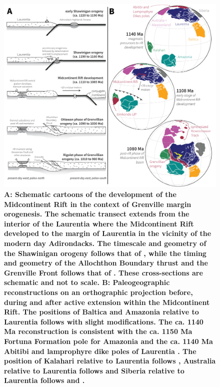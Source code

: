 \documentclass[11pt,letterpaper]{article}
\begin{document}
\begin{figure}
\centering
\includegraphics[width=6.5 in]{Figures/Fig12_cross-section_paleogeo.pdf}
\caption{\small{\textbf{A: Schematic cartoons of the development of the Midcontinent Rift in the context of Grenville margin orogenesis. The schematic transect extends from the interior of the Laurentia where the Midcontinent Rift developed to the margin of Laurentia in the vicinity of the modern day Adirondacks. The timescale and geometry of the Shawinigan orogeny follows that of \cite{Mclelland2013a}, while the timing and geometry of the Allochthon Boundary thrust and the Grenville Front follows that of \cite{Hynes2010a}. These cross-sections are schematic and not to scale. B: Paleogeographic reconstructions on an orthographic projection before, during and after active extension within the Midcontinent Rift. The positions of Baltica and Amazonia relative to Laurentia follows \cite{Evans2013b} with slight modifications. The ca. 1140 Ma reconstruction is consistent with the ca. 1150 Ma Fortuna Formation pole for Amazonia \citep{DAgrella-Filho2008a} and the ca. 1140 Ma Abitibi and lamprophyre dike poles of Laurentia \citep{Ernst1993a,Piispa2018a}. The position of Kalahari relative to Laurentia follows \cite{Swanson-Hysell2015b}, Australia relative to Laurentia follows \cite{Swanson-Hysell2012a} and Siberia relative to Laurentia follows \cite{Ernst2016a} and \cite{Evans2016b}.}}}
\label{fig:cross_section}
\end{figure}
\end{document}
